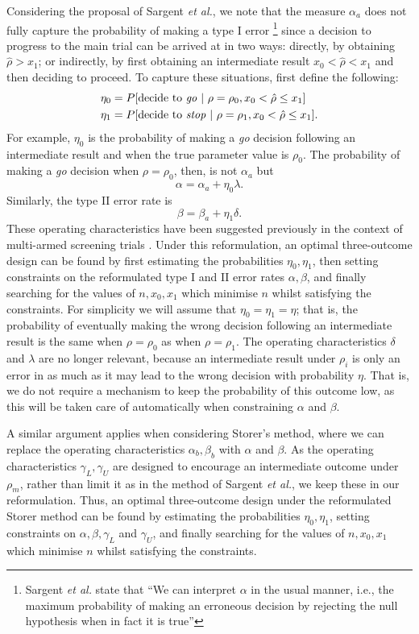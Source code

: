 \documentclass[sagev]{sagej}
\begin{document}
Considering the proposal of Sargent \emph{et al.}, we note that the measure $\alpha_a$ does not fully capture the probability of making a type I error \footnote{Sargent \emph{et al.}  state that ``We  can interpret $\alpha$ in the usual  manner,  i.e., the  maximum probability of making an erroneous decision by rejecting the null hypothesis when in fact it is true''} since a decision to progress to the main trial can be arrived at in two ways: directly, by obtaining $\hat{\rho} > x_1$; or indirectly, by first obtaining an intermediate result $x_0 < \hat{\rho} < x_1$ and then deciding to proceed. To capture these situations, first define the following:
\begin{align}
\eta_0 &= P[\text{decide to \emph{go}} ~|~ \rho = \rho_0, x_0 < \hat{\rho} \leq x_1] \\
\eta_1 &= P[\text{decide to \emph{stop}} ~|~ \rho = \rho_1, x_0 < \hat{\rho} \leq x_1].
\end{align}
For example, $\eta_0$ is the probability of making a \emph{go} decision following an intermediate result and when the true parameter value is $\rho_0$. The probability of making a \emph{go} decision when $\rho = \rho_0$, then, is not $\alpha_a$ but
$$
\alpha = \alpha_a + \eta_0 \lambda.
$$
Similarly, the type II error rate is
$$
\beta = \beta_a + \eta_1 \delta.
$$
These operating characteristics have been suggested previously in the context of multi-armed screening trials \cite{Sargent2001a, Dehbi2020}. Under this reformulation, an optimal three-outcome design can be found by first estimating the probabilities $\eta_0, \eta_1$, then setting constraints on the reformulated type I and II error rates $\alpha, \beta$, and finally searching for the values of  $n, x_0, x_1$ which minimise $n$ whilst satisfying the constraints. For simplicity we will assume that $\eta_0 = \eta_1 = \eta$; that is, the probability of eventually making the wrong decision following an intermediate result is the same when $\rho = \rho_0$ as when $\rho = \rho_1$. The operating characteristics $\delta$ and $\lambda$ are no longer relevant, because an intermediate result under $\rho_i$ is only an error in as much as it may lead to the wrong decision with probability $\eta$. That is, we do not require a mechanism to keep the probability of this outcome low, as this will be taken care of automatically when constraining $\alpha$ and $\beta$.

A similar argument applies when considering Storer's method, where we can replace the operating characteristics $\alpha_b, \beta_b$ with $\alpha$ and $\beta$. As the operating characteristics $\gamma_L, \gamma_U$ are designed to encourage an intermediate outcome under $\rho_m$, rather than limit it as in the method of Sargent \emph{et al.}, we keep these in our reformulation. Thus, an optimal three-outcome design under the reformulated Storer method can be found by estimating the probabilities $\eta_0, \eta_1$, setting constraints on $\alpha, \beta, \gamma_L$ and $\gamma_U$, and finally searching for the values of  $n, x_0, x_1$ which minimise $n$ whilst satisfying the constraints. 
\end{document}
